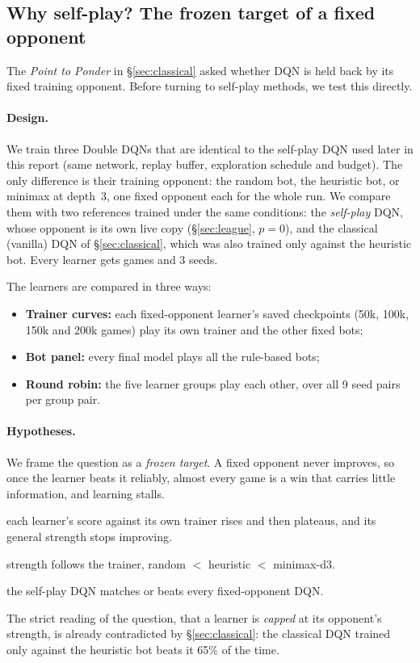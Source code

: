 \documentclass[11pt]{article}
\begin{document}
\subsection{Why self-play? The frozen target of a fixed opponent}
\label{sec:frozen}

The \emph{Point to Ponder} in \S\ref{sec:classical} asked whether DQN is held
back by its fixed training opponent. Before turning to self-play methods, we
test this directly.

\paragraph{Design.} We train three Double DQNs that are identical to the
self-play DQN used later in this report (same network, replay buffer,
exploration schedule and budget). The only difference is their training
opponent: the random bot, the heuristic bot, or minimax at depth~3, one fixed
opponent each for the whole run. We compare them with two references trained
under the same conditions: the \emph{self-play} DQN, whose opponent is its own
live copy (\S\ref{sec:league}, $p=0$), and the classical (vanilla) DQN of
\S\ref{sec:classical}, which was also trained only against the heuristic bot. Every learner gets
\TrainGames{} games and 3 seeds.

The learners are compared in three ways:
\begin{itemize}[leftmargin=*]
  \item \textbf{Trainer curves:} each fixed-opponent learner's saved checkpoints
        (50k, 100k, 150k and 200k games) play its own trainer and the other
        fixed bots;
  \item \textbf{Bot panel:} every final model plays all the rule-based bots;
  \item \textbf{Round robin:} the five learner groups play each other, over all
        9 seed pairs per group pair.
\end{itemize}

\paragraph{Hypotheses.} We frame the question as a \emph{frozen target}. A
fixed opponent never improves, so once the learner beats it reliably, almost
every game is a win that carries little information, and learning stalls.
\begin{description}[leftmargin=1.2em,style=nextline,itemsep=2pt]
  \item[(a) Frozen target:] each learner's score against its own trainer rises
        and then plateaus, and its general strength stops improving.
  \item[(b) Ordering:] strength follows the trainer, random $<$ heuristic $<$
        minimax-d3.
  \item[(c) Self-play:] the self-play DQN matches or beats every fixed-opponent
        DQN.
\end{description}
The strict reading of the question, that a learner is \emph{capped} at its
opponent's strength, is already contradicted by \S\ref{sec:classical}: the
classical DQN trained only against the heuristic bot beats it 65\% of the time.
\end{document}
